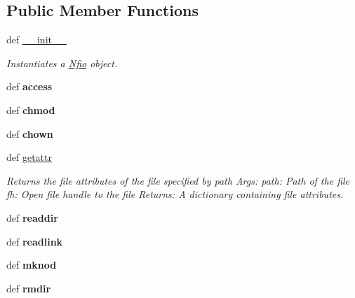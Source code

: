 \subsection*{Public Member Functions}
\begin{DoxyCompactItemize}
\item 
def \hyperlink{classnfio_1_1Nfio_a37d06beb4658927077f41fdfd237c2b1}{\-\_\-\-\_\-init\-\_\-\-\_\-}
\begin{DoxyCompactList}\small\item\em Instantiates a \hyperlink{classnfio_1_1Nfio}{Nfio} object. \end{DoxyCompactList}\item 
\hypertarget{classnfio_1_1Nfio_a73f04474e4c327027cc36e9a27d8d37d}{def {\bfseries access}}\label{classnfio_1_1Nfio_a73f04474e4c327027cc36e9a27d8d37d}

\item 
\hypertarget{classnfio_1_1Nfio_a0e1a2a60c6ad3552b9e737bf5c21b298}{def {\bfseries chmod}}\label{classnfio_1_1Nfio_a0e1a2a60c6ad3552b9e737bf5c21b298}

\item 
\hypertarget{classnfio_1_1Nfio_a69cc0d977007fc2057f167acfd484293}{def {\bfseries chown}}\label{classnfio_1_1Nfio_a69cc0d977007fc2057f167acfd484293}

\item 
def \hyperlink{classnfio_1_1Nfio_a46d186e9d92c1fea58a01ffc08ebb5dc}{getattr}
\begin{DoxyCompactList}\small\item\em Returns the file attributes of the file specified by path Args\-: path\-: Path of the file fh\-: Open file handle to the file Returns\-: A dictionary containing file attributes. \end{DoxyCompactList}\item 
\hypertarget{classnfio_1_1Nfio_a648947134659a41ad9b2b68d1aa7edfe}{def {\bfseries readdir}}\label{classnfio_1_1Nfio_a648947134659a41ad9b2b68d1aa7edfe}

\item 
\hypertarget{classnfio_1_1Nfio_a28f5eba4c82e6b5d7fb13654eb97cb8f}{def {\bfseries readlink}}\label{classnfio_1_1Nfio_a28f5eba4c82e6b5d7fb13654eb97cb8f}

\item 
\hypertarget{classnfio_1_1Nfio_ab34cbc64205b1932d86b6f79063710e4}{def {\bfseries mknod}}\label{classnfio_1_1Nfio_ab34cbc64205b1932d86b6f79063710e4}

\item 
\hypertarget{classnfio_1_1Nfio_afb377c76425223681e5aa703d75fc6ac}{def {\bfseries rmdir}}\label{classnfio_1_1Nfio_afb377c76425223681e5aa703d75fc6ac}


\end{DoxyCompactItemize}
